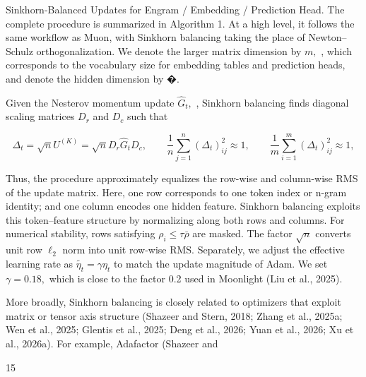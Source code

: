 \documentclass[
  10
]{article}
\begin{document}
Sinkhorn-Balanced Updates for Engram / Embedding / Prediction Head. The
complete procedure is summarized in Algorithm 1. At a high level, it
follows the same workflow as Muon, with Sinkhorn balancing taking the
place of Newton--Schulz orthogonalization. We denote the larger matrix
dimension by \(m ,\) , which corresponds to the vocabulary size for
embedding tables and prediction heads, and denote the hidden dimension
by �.

Given the Nesterov momentum update \(\widehat { G } _ { t } ,\) ,
Sinkhorn balancing finds diagonal scaling matrices \(D _ { r }\) and
\(D _ { c }\) such that

\[
\Delta _ { t } = \sqrt { n } U ^ { ( K ) } = \sqrt { n } D _ { r } \widehat { G } _ { t } D _ { c } , \qquad \frac { 1 } { n } \sum _ { j = 1 } ^ { n } ( \Delta _ { t } ) _ { i j } ^ { 2 } \approx 1 , \qquad \frac { 1 } { m } \sum _ { i = 1 } ^ { m } ( \Delta _ { t } ) _ { i j } ^ { 2 } \approx 1 ,\tag{7}
\]

Thus, the procedure approximately equalizes the row-wise and column-wise
RMS of the update matrix. Here, one row corresponds to one token index
or n-gram identity; and one column encodes one hidden feature. Sinkhorn
balancing exploits this token--feature structure by normalizing along
both rows and columns. For numerical stability, rows satisfying
\(\rho _ { i } \leqslant \tau \bar { \rho }\) are masked. The factor
\(\sqrt { n }\) converts unit row \(\ell _ { 2 }\) norm into unit
row-wise RMS. Separately, we adjust the effective learning rate as
\(\widetilde { \eta _ { t } } = \gamma \eta _ { t }\) to match the
update magnitude of Adam. We set \(\gamma = 0 . 1 8 ,\) which is close
to the factor 0.2 used in Moonlight (Liu et al., 2025).

More broadly, Sinkhorn balancing is closely related to optimizers that
exploit matrix or tensor axis structure (Shazeer and Stern, 2018; Zhang
et al., 2025a; Wen et al., 2025; Glentis et al., 2025; Deng et al.,
2026; Yuan et al., 2026; Xu et al., 2026a). For example, Adafactor
(Shazeer and

15
\end{document}
